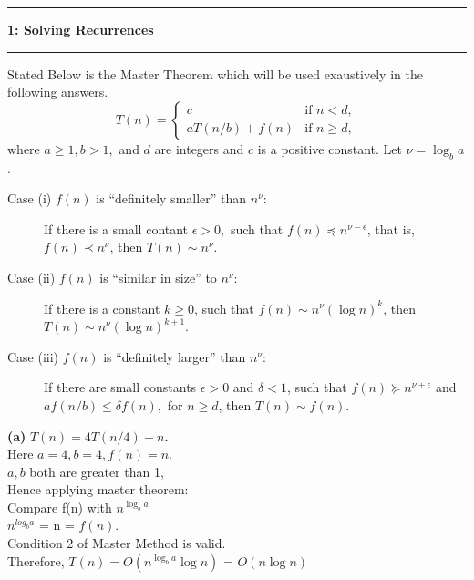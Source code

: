 \documentclass[11pt]{article}
\newcommand\question[2]{\vspace{.25in}\hrule\textbf{#1: #2}\vspace{.5em}\hrule\vspace{.10in}}
\renewcommand\part[1]{\vspace{.10in}\textbf{(#1)}}
\begin{document}
\raggedright
\newcommand\NAME{Aishwarya Asesh}  %
\newcommand\UID{u1063384}     %
\newcommand\HWNUM{1}              %



\question{1}{Solving Recurrences}
Stated Below is the Master Theorem which will be used exaustively in the following answers.
$$T(n) = \left\{ \begin{array}{ll}
                   c             & \mbox{if $n < d$,}\\
                   aT(n/b) + f(n)& \mbox{if $n \geq d$},
                 \end{array}
         \right. $$
where $a \geq 1, b > 1,$ and $d$ are integers and $c$ is a positive
constant.  Let $\nu = \log_b a$.
\begin{description}
\item[Case (i) $f(n)$ is ``definitely smaller'' than $n^\nu$:] If there is a small contant $\epsilon > 0,$ such that 
$f(n) \preceq n^{\nu - \epsilon}$, that is,
$f(n) \prec n^\nu$, then $T(n) \sim n^\nu$.

\item[Case (ii) $f(n)$ is ``similar in size'' to $n^\nu$:] If there is a constant $k \geq 0$, such that 
$f(n) \sim n^{\nu}( \log n)^k$, then 
$T(n) \sim n^{\nu}(\log n)^{k+1}$.

\item[Case (iii) $f(n)$ is ``definitely larger'' than $n^\nu$:] If there are small constants $\epsilon > 0$ and $\delta < 1$, such
that $f(n) \succeq n^{\nu + \epsilon}$ and $a f(n/b) \leq \delta
f(n),$ for $n \geq d$, then $T(n) \sim f(n)$.

\end{description}

\part{a} \textbf{$T(n) = 4T(n/4) + n$.}
\\Here $a=4,b=4,f(n)=n$.
\\ $a,b$ both are greater than 1,
\\Hence applying master theorem: 
\\Compare f(n) with $n^{\log_{b}a}$
\\$n^{log_{b}a}$ = n = $f(n)$. 
\\Condition 2 of Master Method is valid.
\\Therefore, $T(n)=O(n^{\log_{b}a}\log n)$ = $O(n\log n)$
\end{document}
